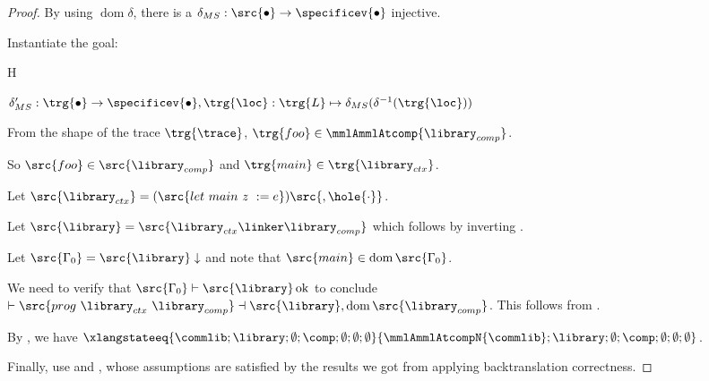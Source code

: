 \documentclass[a4paper,names,dvipsnames]{article}
\begin{document}
\begin{proof}
  By  using $\operatorname{dom}\delta$, there is a $\delta_{MS}:\src{\bullet}\to\specificev{\bullet}$ injective.

  Instantiate the goal:
  \begin{passumptions}{H}
    \setcounter{enumi}{5}
    \item $\delta_{MS}' : \trg{\bullet}\to\specificev{\bullet}, \trg{\loc}:\trg{L}\mapsto \delta_{MS}(\delta^{-1}(\trg{\loc}))$
  \end{passumptions}

  From the shape of the trace $\trg{\trace}$, $\trg{foo}\in\mmlAmmlAtcomp{\library_{comp}}$.

  So $\src{foo}\in\src{\library_{comp}}$ and $\trg{main}\in\trg{\library_{ctx}}$.

  Let $\src{\library_{ctx}}=(\src{let\ main\ z\ := e})\src{,\hole{\cdot}}$.

  Let $\src{\library} = \src{\library_{ctx}\linker\library_{comp}}$ which follows by inverting .

  Let $\src{\Gamma_0}=\src{\library}\downarrow$ and note that $\src{main}\in\operatorname{dom}\src{\Gamma_0}$.

  We need to verify that $\src{\Gamma_0}\vdash\src{\library}\operatorname{ok}$ to conclude $\vdash\src{prog\ \library_{ctx}\ \library_{comp}}\dashv\src{\library},\operatorname{dom}\src{\library_{comp}}$.
  This follows from .

  By , we have $\xlangstateeq{\commlib;\library;\emptyset;\comp;\emptyset;\emptyset;\emptyset}{\mmlAmmlAtcompN{\commlib};\library;\emptyset;\comp;\emptyset;\emptyset;\emptyset}$.

  Finally, use  and , whose assumptions are satisfied by the results we got from applying backtranslation correctness.
\end{proof}
\end{document}
